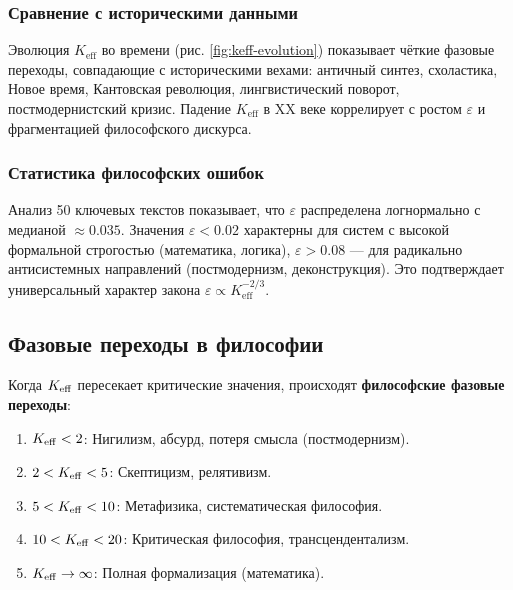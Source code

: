 \documentclass[12pt,a4paper]{article}
\newcommand{\eps}{\varepsilon}
\begin{document}
	\subsubsection{Сравнение с историческими данными}
	
	Эволюция \(K_{\mathrm{eff}}\) во времени (рис. \ref{fig:keff-evolution}) показывает чёткие фазовые переходы, совпадающие с историческими вехами: античный синтез, схоластика, Новое время, Кантовская революция, лингвистический поворот, постмодернистский кризис. Падение \(K_{\mathrm{eff}}\) в XX веке коррелирует с ростом \(\eps\) и фрагментацией философского дискурса.
	
	\subsubsection{Статистика философских ошибок}
	
	Анализ 50 ключевых текстов показывает, что \(\eps\) распределена логнормально с медианой \(\approx 0.035\). Значения \(\eps < 0.02\) характерны для систем с высокой формальной строгостью (математика, логика), \(\eps > 0.08\) — для радикально антисистемных направлений (постмодернизм, деконструкция). Это подтверждает универсальный характер закона \(\eps \propto K_{\mathrm{eff}}^{-2/3}\).
	
	
	\subsection{Фазовые переходы в философии}
	
	Когда \(\Keff\) пересекает критические значения, происходят \textbf{философские фазовые переходы}:
	
	\begin{enumerate}
		\item \(\Keff < 2\): Нигилизм, абсурд, потеря смысла (постмодернизм).
		\item \(2 < \Keff < 5\): Скептицизм, релятивизм.
		\item \(5 < \Keff < 10\): Метафизика, систематическая философия.
		\item \(10 < \Keff < 20\): Критическая философия, трансцендентализм.
		\item \(\Keff \to \infty\): Полная формализация (математика).
	\end{enumerate}
	
\end{document}
